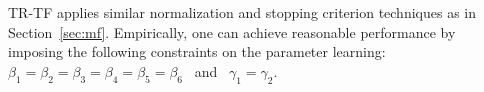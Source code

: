 TR-TF applies similar normalization and stopping criterion techniques as in Section~\ref{sec:mf}.
Empirically, one can achieve reasonable performance by imposing the following constraints on the parameter learning:  
$\beta_1=\beta_2=\beta_3=\beta_4=\beta_5=\beta_6$ \mbox{ and } $\gamma_1=\gamma_2$.
